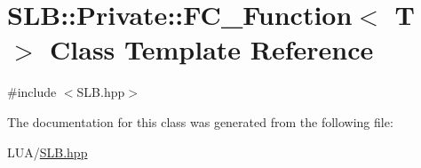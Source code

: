 \hypertarget{classSLB_1_1Private_1_1FC__Function}{}\section{S\+LB\+:\+:Private\+:\+:F\+C\+\_\+\+Function$<$ T $>$ Class Template Reference}
\label{classSLB_1_1Private_1_1FC__Function}


{\ttfamily \#include $<$S\+L\+B.\+hpp$>$}



The documentation for this class was generated from the following file\+:\begin{DoxyCompactItemize}
\item 
L\+U\+A/\hyperlink{SLB_8hpp}{S\+L\+B.\+hpp}\end{DoxyCompactItemize}
